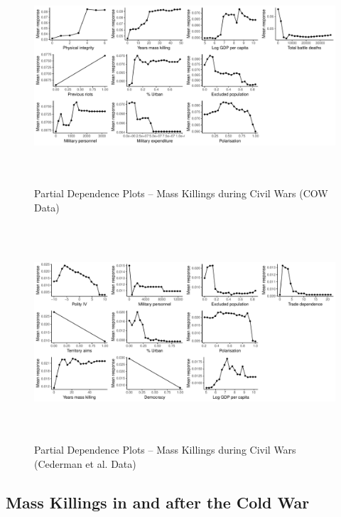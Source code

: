 \begin{figure}[H]
    \begin{center}
    \includegraphics[width=\textwidth, height=8cm]{images/rf-cow-pd.pdf}
    \caption{Partial Dependence Plots -- Mass Killings during Civil Wars (COW Data)}
    \label{fig:drfdpp3}
    \end{center}
\end{figure}	
	
\begin{figure}[H]
    \begin{center}
    \includegraphics[width=\textwidth, height=8cm]{images/rf-eth-pd.pdf}
    \caption{Partial Dependence Plots -- Mass Killings during Civil Wars (Cederman et al. Data)}
    \label{fig:drfdpp4}
    \end{center}
\end{figure}

\subsection{Mass Killings in and after the Cold War}%
\label{sub:mass_killings_in_and_after_the_cold_war}

